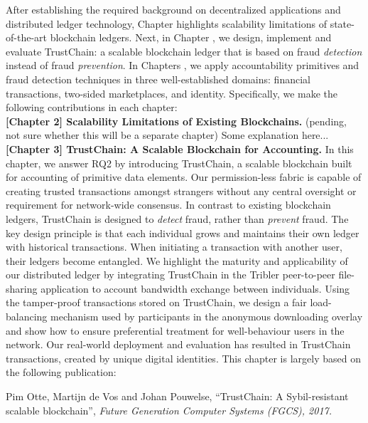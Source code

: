 After establishing the required background on decentralized applications and distributed ledger technology, Chapter  highlights scalability limitations of state-of-the-art blockchain ledgers.
Next, in Chapter , we design, implement and evaluate TrustChain: a scalable blockchain ledger that is based on fraud \emph{detection} instead of fraud \emph{prevention}.
In Chapters , we apply accountability primitives and fraud detection techniques in three well-established domains: financial transactions, two-sided marketplaces, and identity.
Specifically, we make the following contributions in each chapter:\\

\textbf{[Chapter 2] Scalability Limitations of Existing Blockchains.} (pending, not sure whether this will be a separate chapter)
Some explanation here...\\

\textbf{[Chapter 3] TrustChain: A Scalable Blockchain for Accounting.}
In this chapter, we answer RQ2 by introducing TrustChain, a scalable blockchain built for accounting of primitive data elements.
Our permission-less fabric is capable of creating trusted transactions amongst strangers without any central oversight or requirement for network-wide consensus.
In contrast to existing blockchain ledgers, TrustChain is designed to \emph{detect} fraud, rather than \emph{prevent} fraud.
The key design principle is that each individual grows and maintains their own ledger with historical transactions.
When initiating a transaction with another user, their ledgers become entangled.
We highlight the maturity and applicability of our distributed ledger by integrating TrustChain in the Tribler peer-to-peer file-sharing application to account bandwidth exchange between individuals.
Using the tamper-proof transactions stored on TrustChain, we design a fair load-balancing mechanism used by participants in the anonymous downloading overlay and show how to ensure preferential treatment for well-behaviour users in the network. %
Our real-world deployment and evaluation has resulted in  TrustChain transactions, created by  unique digital identities.
This chapter is largely based on the following publication:

Pim Otte, Martijn de Vos and Johan Pouwelse, \enquote{TrustChain: A Sybil-resistant scalable blockchain}, \emph{Future Generation Computer Systems (FGCS), 2017.}\\

